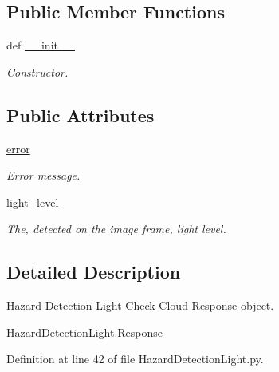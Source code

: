 \subsection*{Public Member Functions}
\begin{DoxyCompactItemize}
\item 
def \hyperlink{classRappCloud_1_1CloudMsgs_1_1HazardDetectionLight_1_1HazardDetectionLight_1_1Response_af07bcd9fcbb1a9335c61938c2afe9e1a}{\-\_\-\-\_\-init\-\_\-\-\_\-}
\begin{DoxyCompactList}\small\item\em Constructor. \end{DoxyCompactList}\end{DoxyCompactItemize}
\subsection*{Public Attributes}
\begin{DoxyCompactItemize}
\item 
\hyperlink{classRappCloud_1_1CloudMsgs_1_1HazardDetectionLight_1_1HazardDetectionLight_1_1Response_a76a931e94a670d8218f0f5c7c8d65b25}{error}
\begin{DoxyCompactList}\small\item\em Error message. \end{DoxyCompactList}\item 
\hyperlink{classRappCloud_1_1CloudMsgs_1_1HazardDetectionLight_1_1HazardDetectionLight_1_1Response_a0fcc82151d8be5cbc7ca48fec93f4b97}{light\-\_\-level}
\begin{DoxyCompactList}\small\item\em The, detected on the image frame, light level. \end{DoxyCompactList}\end{DoxyCompactItemize}


\subsection{Detailed Description}
\begin{DoxyVerb}Hazard Detection Light Check Cloud Response object.

HazardDetectionLight.Response
\end{DoxyVerb}
 

Definition at line 42 of file Hazard\-Detection\-Light.\-py.



